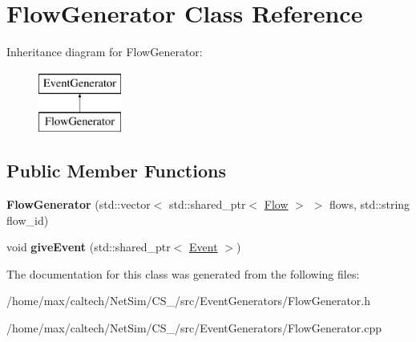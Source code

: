 \hypertarget{classFlowGenerator}{\section{\-Flow\-Generator \-Class \-Reference}
\label{classFlowGenerator}
}
\-Inheritance diagram for \-Flow\-Generator\-:\begin{figure}[H]
\begin{center}
\leavevmode
\includegraphics[height=2.000000cm]{classFlowGenerator}
\end{center}
\end{figure}
\subsection*{\-Public \-Member \-Functions}
\begin{DoxyCompactItemize}
\item 
\hypertarget{classFlowGenerator_ae51c2e304770a911f9cc1d8e0d01310c}{{\bfseries \-Flow\-Generator} (std\-::vector$<$ std\-::shared\-\_\-ptr$<$ \hyperlink{classFlow}{\-Flow} $>$ $>$ flows, std\-::string flow\-\_\-id)}\label{classFlowGenerator_ae51c2e304770a911f9cc1d8e0d01310c}

\item 
\hypertarget{classFlowGenerator_a5c4ac4997c37c524a7c1c8ab264eb882}{void {\bfseries give\-Event} (std\-::shared\-\_\-ptr$<$ \hyperlink{classEvent}{\-Event} $>$)}\label{classFlowGenerator_a5c4ac4997c37c524a7c1c8ab264eb882}

\end{DoxyCompactItemize}


\-The documentation for this class was generated from the following files\-:\begin{DoxyCompactItemize}
\item 
/home/max/caltech/\-Net\-Sim/\-C\-S\-\_/src/\-Event\-Generators/\-Flow\-Generator.\-h\item 
/home/max/caltech/\-Net\-Sim/\-C\-S\-\_/src/\-Event\-Generators/\-Flow\-Generator.\-cpp\end{DoxyCompactItemize}
